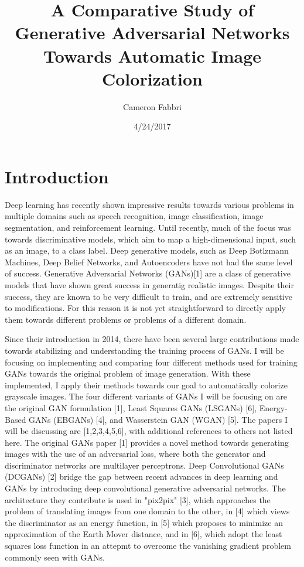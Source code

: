 \documentclass[9pt]{article}
\begin{document}
\title{A Comparative Study of Generative Adversarial Networks Towards Automatic Image Colorization}

\author{Cameron Fabbri}
\date{4/24/2017}

\maketitle

\section{Introduction}
Deep learning has recently shown impressive results towards various problems in multiple domains such as speech recognition,
image classification, image segmentation, and reinforcement learning. Until recently, much of the focus was towards
discriminative models, which aim to map a high-dimensional input, such as an image, to a class label. Deep generative models,
such as Deep Botlzmann Machines, Deep Belief Networks, and Autoencoders have not had the same level of success.
Generative Adversarial Networks (GANs)[1] are a class of generative models that have shown great success in generatig realistic
images. Despite their success, they are known to be very difficult to train, and are extremely sensitive to modifications.
For this reason it is not yet straightforward to directly apply them towards different problems or problems of a different domain.\newline

\noindent Since their introduction in 2014, there have been several large contributions made towards stabilizing and understanding
the training process of GANs. I will be focusing on implementing and comparing four different methods used for training GANs towards
the original problem of image generation. With these implemented, I apply their methods towards our goal to automatically
colorize grayscale images. The four different variants of GANs I will be focusing on are the original GAN formulation [1], Least Squares
GANs (LSGANs) [6], Energy-Based GANs (EBGANs) [4], and Wasserstein GAN (WGAN) [5]. The papers I will be discussing are [1,2,3,4,5,6], with additional
references to others not listed here. The original GANs paper [1] provides a novel method towards generating images with the use of an
adversarial loss, where both the generator and discriminator networks are multilayer perceptrons. Deep Convolutional GANs (DCGANs) [2]
bridge the gap between recent advances in deep learning and GANs by introducing deep convolutional generative adversarial networks. The architecture they contribute
is used in "pix2pix" [3], which approaches the problem of translating images from one domain to the other, in [4] which views the discriminator
as an energy function, in [5] which proposes to minimize an approximation of the Earth Mover distance, and in [6], which adopt the
least squares loss function in an attepmt to overcome the vanishing gradient problem commonly seen with GANs.
\end{document}
